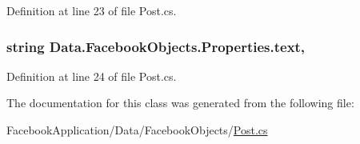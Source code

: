 Definition at line 23 of file Post.\+cs.

\subsubsection[{\texorpdfstring{text}{text}}]{\setlength{\rightskip}{0pt plus 5cm}string Data.\+Facebook\+Objects.\+Properties.\+text\hspace{0.3cm}{\ttfamily [get]}, {\ttfamily [set]}}\hypertarget{class_data_1_1_facebook_objects_1_1_properties_aed35ce8968a53f6250ad88398e4218b1}{}\label{class_data_1_1_facebook_objects_1_1_properties_aed35ce8968a53f6250ad88398e4218b1}


Definition at line 24 of file Post.\+cs.



The documentation for this class was generated from the following file\+:\begin{DoxyCompactItemize}
\item 
Facebook\+Application/\+Data/\+Facebook\+Objects/\hyperlink{_post_8cs}{Post.\+cs}\end{DoxyCompactItemize}
